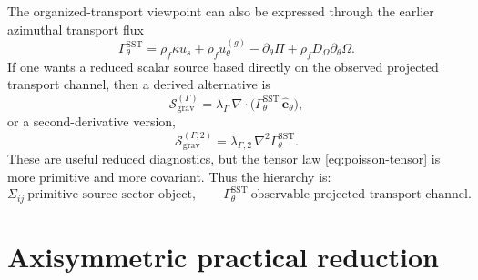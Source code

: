 \documentclass[11pt]{article}
\newcommand{\rhoF}{\rho_{\!f}}
\newcommand{\SST}{\mathrm{SST}}
\newcommand{\grav}{\mathrm{grav}}
\begin{document}
        The organized-transport viewpoint can also be expressed through the earlier azimuthal transport flux
        \begin{equation}
            \Gamma_\theta^{\SST}
            =
            \rhoF \kappa u_s
            +
            \rhoF u_\theta^{(g)}
            -
            \partial_\theta \Pi
            +
            \rhoF D_\Omega \partial_\theta \Omega.
            \label{eq:Gamma-theta-repeat}
        \end{equation}
        If one wants a reduced scalar source based directly on the observed projected transport channel, then a derived alternative is
        \begin{equation}
            \mathcal{S}_{\grav}^{(\Gamma)}
            =
            \lambda_\Gamma\, \nabla\cdot\bigl(\Gamma_\theta^{\SST}\,\hat{\mathbf e}_\theta \bigr),
            \label{eq:Sgamma}
        \end{equation}
        or a second-derivative version,
        \begin{equation}
            \mathcal{S}_{\grav}^{(\Gamma,2)}
            =
            \lambda_{\Gamma,2}\,\nabla^2 \Gamma_\theta^{\SST}.
            \label{eq:Sgamma2}
        \end{equation}
        These are useful reduced diagnostics, but the tensor law \eqref{eq:poisson-tensor} is more primitive and more covariant. Thus the hierarchy is:
        \begin{equation}
            \boxed{
                \Sigma_{ij}
                \ \text{primitive source-sector object},
                \qquad
                \Gamma_\theta^{\SST}
                \ \text{observable projected transport channel}.
            }
            \label{eq:hierarchy}
        \end{equation}
        
        \section{Axisymmetric practical reduction}
        
\end{document}

